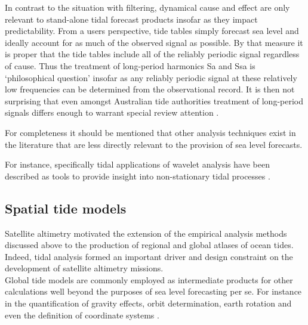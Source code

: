 In contrast to the situation with filtering, dynamical cause and effect are only relevant to stand-alone tidal forecast products insofar as they impact predictability.  From a users perspective, tide tables simply forecast sea level and ideally account for as much of the observed signal as possible.   By that measure it is proper that the tide tables include all of the reliably periodic signal regardless of cause.   
Thus the treatment of long-period harmonics Sa and Ssa is `philosophical question' \citep{Parker:2007wq} insofar as any reliably periodic signal at these relatively low frequencies can be determined from the observational record.  It is then not surprising that even amongst Australian tide authorities treatment of long-period signals differs enough to warrant special review attention \citep{MHL2156}.

For completeness it should be mentioned that other analysis techniques exist in the literature that are less directly relevant to the provision of sea level forecasts.


For instance, specifically tidal applications of wavelet analysis have been described as tools to provide insight into non-stationary tidal processes \citep{Flinchem:2000kp}.



\subsection{Spatial tide models}
\label{sec:spatialTides}
Satellite altimetry motivated the extension of the empirical analysis methods discussed above to the production of regional and global atlases of ocean tides.  Indeed, tidal analysis formed an important driver and design constraint on the development of satellite altimetry missions.\\
Global tide models are commonly employed as intermediate products for other calculations well beyond the purposes of sea level forecasting per se.  For instance in the quantification of gravity effects, orbit determination, earth rotation and even the definition of coordinate systems \citep{Anonymous:2004tm}.\\



